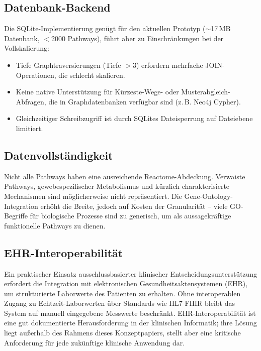 \documentclass[12pt,a4paper]{article}
\begin{document}
\subsection{Datenbank-Backend}

Die SQLite-Implementierung genügt für den aktuellen Prototyp ($\sim$17\,MB Datenbank, $<$2000 Pathways), führt aber zu Einschränkungen bei der Vollskalierung:

\begin{itemize}
    \item Tiefe Graphtraversierungen (Tiefe $>3$) erfordern mehrfache JOIN-Operationen, die schlecht skalieren.
    \item Keine native Unterstützung für Kürzeste-Wege- oder Musterabgleich-Abfragen, die in Graphdatenbanken verfügbar sind (z.\,B. Neo4j Cypher).
    \item Gleichzeitiger Schreibzugriff ist durch SQLites Dateisperrung auf Dateiebene limitiert.
\end{itemize}

\subsection{Datenvollständigkeit}

Nicht alle Pathways haben eine ausreichende Reactome-Abdeckung. Verwaiste Pathways, gewebespezifischer Metabolismus und kürzlich charakterisierte Mechanismen sind möglicherweise nicht repräsentiert. Die Gene-Ontology-Integration erhöht die Breite, jedoch auf Kosten der Granularität -- viele GO-Begriffe für biologische Prozesse sind zu generisch, um als aussagekräftige funktionelle Pathways zu dienen.

\subsection{EHR-Interoperabilität}

Ein praktischer Einsatz ausschlussbasierter klinischer Entscheidungsunterstützung erfordert die Integration mit elektronischen Gesundheitsaktensystemen (EHR), um strukturierte Laborwerte des Patienten zu erhalten. Ohne interoperablen Zugang zu Echtzeit-Laborwerten über Standards wie HL7 FHIR \citep{HL7FHIR2023} bleibt das System auf manuell eingegebene Messwerte beschränkt. EHR-Interoperabilität ist eine gut dokumentierte Herausforderung in der klinischen Informatik; ihre Lösung liegt außerhalb des Rahmens dieses Konzeptpapiers, stellt aber eine kritische Anforderung für jede zukünftige klinische Anwendung dar.
\end{document}
